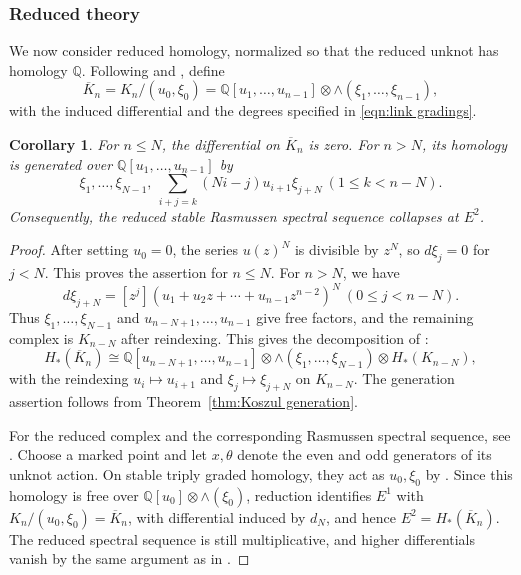 \documentclass[reqno]{amsart}
\newtheorem{cor}[thm]{Corollary}
\theoremstyle{definition}
\theoremstyle{remark}
\newcommand{\QQ}{\mathbb{Q}}
\begin{document}
\subsubsection{Reduced theory}
We now consider reduced homology, normalized so that the reduced unknot has homology $\QQ$. Following \cite[Section~5]{gorsky2013stable} and \cite[Section~2.3]{gorsky2015stable}, define
\[\overline K_n=K_n/(u_0,\xi_0)=\QQ[u_1,\dots,u_{n-1}]\otimes\wedge(\xi_1,\dots,\xi_{n-1}),\]
with the induced differential and the degrees specified in \eqref{eqn:link gradings}.

\begin{cor}\label{cor:reduced}
For $n\le N$, the differential on $\overline K_n$ is zero. For $n>N$, its homology is generated over $\QQ[u_1,\dots,u_{n-1}]$ by
\[\xi_1,\dots,\xi_{N-1},\ \sum_{i+j=k}(Ni-j)u_{i+1}\xi_{j+N}\ (1\le k<n-N).\]
Consequently, the reduced stable Rasmussen spectral sequence collapses at $E^2$.
\end{cor}

\begin{proof}
After setting $u_0=0$, the series $u(z)^N$ is divisible by $z^N$, so $d\xi_j=0$ for $j<N$. This proves the assertion for $n\le N$. For $n>N$, we have
\[d\xi_{j+N}=[z^j](u_1+u_2z+\cdots+u_{n-1}z^{n-2})^N\ (0\le j<n-N).\]
Thus $\xi_1,\dots,\xi_{N-1}$ and $u_{n-N+1},\dots,u_{n-1}$ give free factors, and the remaining complex is $K_{n-N}$ after reindexing. This gives the decomposition of \cite[Theorem~5]{gorsky2015stable}:
\[H_*(\overline K_n)\cong\QQ[u_{n-N+1},\dots,u_{n-1}]\otimes\wedge(\xi_1,\dots,\xi_{N-1})\otimes H_*(K_{n-N}),\]
with the reindexing $u_i\mapsto u_{i+1}$ and $\xi_j\mapsto\xi_{j+N}$ on $K_{n-N}$. The generation assertion follows from Theorem~\ref{thm:Koszul generation}.

For the reduced complex and the corresponding Rasmussen spectral sequence, see \cite[Section~2.8 and Theorem~5.1]{rasmussen2015differentials}. Choose a marked point and let $x,\theta$ denote the even and odd generators of its unknot action. On stable triply graded homology, they act as $u_0,\xi_0$ by \cite[Theorem~1.6(b)]{ballinger2025stable}. Since this homology is free over $\QQ[u_0]\otimes\wedge(\xi_0)$, reduction identifies $E^1$ with $K_n/(u_0,\xi_0)=\overline K_n$, with differential induced by $d_N$, and hence $E^2=H_*(\overline K_n)$. The reduced spectral sequence is still multiplicative, and higher differentials vanish by the same argument as in \cite[Theorem 7.5]{ballinger2025stable}.
\end{proof}
\end{document}
